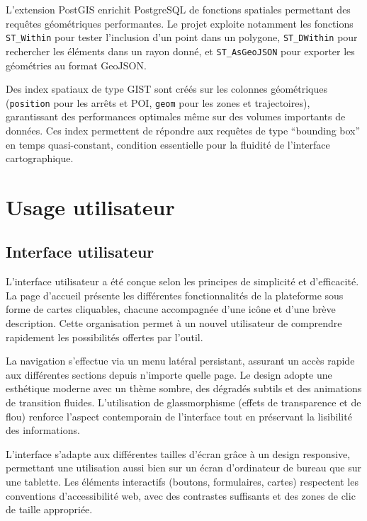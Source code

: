 \documentclass[french]{tai_info} %
\begin{document}
L'extension PostGIS enrichit PostgreSQL de fonctions spatiales permettant des requêtes géométriques performantes. Le projet exploite notamment les fonctions \texttt{ST\_Within} pour tester l'inclusion d'un point dans un polygone, \texttt{ST\_DWithin} pour rechercher les éléments dans un rayon donné, et \texttt{ST\_AsGeoJSON} pour exporter les géométries au format GeoJSON.

Des index spatiaux de type GIST sont créés sur les colonnes géométriques (\texttt{position} pour les arrêts et POI, \texttt{geom} pour les zones et trajectoires), garantissant des performances optimales même sur des volumes importants de données. Ces index permettent de répondre aux requêtes de type ``bounding box'' en temps quasi-constant, condition essentielle pour la fluidité de l'interface cartographique.

\section{Usage utilisateur}

\subsection{Interface utilisateur}

L'interface utilisateur a été conçue selon les principes de simplicité et d'efficacité. La page d'accueil présente les différentes fonctionnalités de la plateforme sous forme de cartes cliquables, chacune accompagnée d'une icône et d'une brève description. Cette organisation permet à un nouvel utilisateur de comprendre rapidement les possibilités offertes par l'outil.

La navigation s'effectue via un menu latéral persistant, assurant un accès rapide aux différentes sections depuis n'importe quelle page. Le design adopte une esthétique moderne avec un thème sombre, des dégradés subtils et des animations de transition fluides. L'utilisation de glassmorphisme (effets de transparence et de flou) renforce l'aspect contemporain de l'interface tout en préservant la lisibilité des informations.

L'interface s'adapte aux différentes tailles d'écran grâce à un design responsive, permettant une utilisation aussi bien sur un écran d'ordinateur de bureau que sur une tablette. Les éléments interactifs (boutons, formulaires, cartes) respectent les conventions d'accessibilité web, avec des contrastes suffisants et des zones de clic de taille appropriée.
\end{document}

